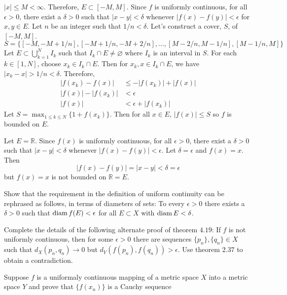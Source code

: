 \begin{exercise}
  \(\lvert x\rvert\leq M < \infty\).
  Therefore, \(E\subset [-M,M]\).
  Since \(f\) is uniformly continuous, for all \(\epsilon > 0\), there exist a
  \(\delta > 0\) such that \(\lvert x - y\rvert < \delta\) whenever
  \(\lvert f(x) - f(y)\rvert < \epsilon\) for \(x,y\in E\).
  Let \(n\) be an integer such that \(1/n < \delta\).
  Let's construct a cover, \(S\), of \([-M,M]\).
  \[
  S = \bigl\{[-M, -M + 1/n], [-M + 1/n, -M + 2/n],\ldots,[M - 2/n, M - 1/n],
  [M - 1/n, M]\bigr\}
  \]
  Let \(E\subset\bigcup_{k = 1}^NI_k\) such that \(I_k\cap E\neq\varnothing\)
  where \(I_k\) is an interval in \(S\).
  For each \(k\in[1,N]\), choose \(x_k\in I_k\cap E\).
  Then for \(x_k,x\in I_k\cap E\), we have
  \(\lvert x_k - x\rvert > 1/n < \delta\).
  Therefore,
  \begin{align*}
    \lvert f(x_k) - f(x)\rvert
    & \leq -\lvert f(x_k)\rvert + \lvert f(x)\rvert\\
    \lvert f(x)\rvert - \lvert f(x_k)\rvert & < \epsilon\\
    \lvert f(x)\rvert & < \epsilon + \lvert f(x_k)\rvert
  \end{align*}
  Let \(S = \max_{1\leq k\leq N}\{1 + f(x_k)\}\).
  Then for all \(x\in E\), \(\lvert f(x)\rvert\leq S\) so \(f\) is bounded on
  \(E\).
  \par\smallskip
  Let \(E = \mathbb{R}\).
  Since \(f(x)\) is uniformly continuous, for all \(\epsilon > 0\), there exist
  a \(\delta > 0\) such that \(\lvert x - y\rvert < \delta\) whenever
  \(\lvert f(x) - f(y)\rvert < \epsilon\).
  Let \(\delta = \epsilon\) and \(f(x) = x\).
  Then
  \[
  \lvert f(x) - f(y)\rvert = \lvert x - y\rvert < \delta = \epsilon
  \]
  but \(f(x) = x\) is not bounded on \(\mathbb{R} = E\).
\item
  \label{4.9}
  Show that the requirement in the definition of uniform continuity can be
  rephrased as follows, in terms of diameters of sets: To every
  \(\epsilon > 0\) there exists a \(\delta > 0\) such that
  \(\operatorname{diam} f(E) < \epsilon\) for all \(E\subset X\) with \(\operatorname{diam} E < \delta\).
\item
  Complete the details of the following alternate  proof of theorem \(4.19\):
  If \(f\) is not uniformly continuous, then for some \(\epsilon > 0\) there
  are sequences \(\{p_n\},\{q_n\}\in X\) such that \(d_X(p_n,q_n)\to 0\) but
  \(d_Y(f(p_n),f(q_n)) > \epsilon\).
  Use theorem \(2.37\) to obtain a contradiction.
\item
  Suppose \(f\) is a uniformaly continuous mapping of a metric space \(X\)
  into a metric space \(Y\) and prove that \(\{f(x_n)\}\) is a Cauchy sequence

\end{exercise}
